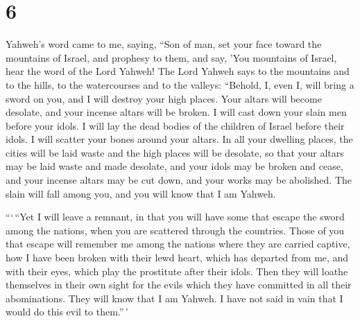 \hypertarget{section-5}{%
\section{6}\label{section-5}}

 Yahweh's word came to me, saying,  ``Son of
man, set your face toward the mountains of Israel, and prophesy to them,
 and say, 'You mountains of Israel, hear the word of the
Lord Yahweh! The Lord Yahweh says to the mountains and to the hills, to
the watercourses and to the valleys: ``Behold, I, even I, will bring a
sword on you, and I will destroy your high places.  Your
altars will become desolate, and your incense altars will be broken. I
will cast down your slain men before your idols.  I will
lay the dead bodies of the children of Israel before their idols. I will
scatter your bones around your altars.  In all your
dwelling places, the cities will be laid waste and the high places will
be desolate, so that your altars may be laid waste and made desolate,
and your idols may be broken and cease, and your incense altars may be
cut down, and your works may be abolished.  The slain will
fall among you, and you will know that I am Yahweh.

 ```\,``Yet I will leave a remnant, in that you will have
some that escape the sword among the nations, when you are scattered
through the countries.  Those of you that escape will
remember me among the nations where they are carried captive, how I have
been broken with their lewd heart, which has departed from me, and with
their eyes, which play the prostitute after their idols. Then they will
loathe themselves in their own sight for the evils which they have
committed in all their abominations.  They will know that
I am Yahweh. I have not said in vain that I would do this evil to
them.''\,'

